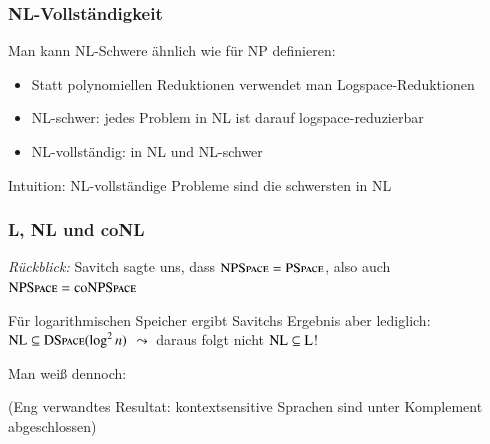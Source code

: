 \documentclass[aspectratio=1610,onlymath]{beamer}
\begin{document}
\begin{frame}\frametitle{NL-Vollständigkeit}

Man kann NL-Schwere ähnlich wie für NP definieren:
\begin{itemize}
\item Statt polynomiellen Reduktionen verwendet man Logspace-Reduktionen
\item NL-schwer: jedes Problem in NL ist darauf logspace-reduzierbar
\item NL-vollständig: in NL und NL-schwer
\end{itemize}
Intuition: NL-vollständige Probleme sind die schwersten in NL
\bigskip\pause

\bigskip\pause

\end{frame}

\begin{frame}\frametitle{L, NL und coNL}

\emph{Rückblick:} Savitch sagte uns, dass ${\textsc{NPSpace}}={\textsc{PSpace}}$, also auch ${\textsc{NPSpace}}={\textsc{coNPSpace}}$
\bigskip\pause

Für logarithmischen Speicher ergibt Savitchs Ergebnis aber lediglich: ${\textsc{NL}}\subseteq{\textsc{DSpace}}(\log^2 n)$
$\leadsto$ daraus folgt nicht ${\textsc{NL}}\subseteq{\textsc{L}}$!
\bigskip\pause

Man weiß dennoch:\bigskip

\pause\medskip

\bigskip

{\tiny
(Eng verwandtes Resultat: kontextsensitive Sprachen sind unter Komplement abgeschlossen)

}

\end{frame}

\end{document}

